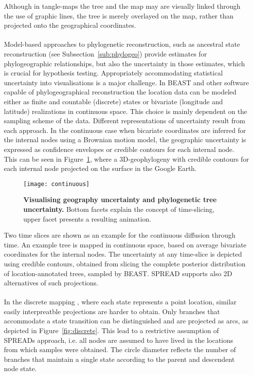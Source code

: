 Although in tangle-maps the tree and the map may are visually linked through the use of graphic lines, the tree is merely overlayed on the map, rather than projected onto the geographical coordinates.

\paragraph{}
Model-based approaches to phylogenetic reconstruction, such as ancestral state reconstruction (see Subsection~\ref{sub:phylogeo}) provide estimates for phylogeographic relationships, but also the uncertainty in those estimates, which is crucial for hypothesis testing.
Appropriately accommodating statistical uncertainty into visualisations is a major challenge.
In BEAST and other software capable of phylogeographical reconstruction the location data can be modeled either as finite and countable (discrete) states or bivariate (longitude and latitude) realizations in continuous space.
This choice is mainly dependent on the sampling scheme of the data.
Different representations of uncertainty result from each approach.
In the continuous case when bicariate coordinates are inferred for the internal nodes using a Brownian motion model, the geographic uncertainty is expressed as confidence envelopes or credible contours for each internal node.
This can be seen in Figure~\ref{fig:cont}, where a 3D-geophylogeny with credible contours for each internal node projected on the surface in the Google Earth.

\begin{figure}[H]
\centering
\texttt{[image: continuous]}
\caption{
{ \footnotesize 
{\bf Visualising geography uncertainty and phylogenetic tree uncertainty.} 
Bottom facets explain the concept of time-slicing, upper facet presents a resulting animation.
} %
}
\label{fig:cont}
\end{figure}

Two time slices are shown as an example for the continuous diffusion through time. 
An example tree is mapped in continuous space, based on average bivariate coordinates for the internal nodes. 
The uncertainty at any time-slice is depicted using credible contours, obtained from slicing the complete posterior distribution of location-annotated trees, sampled by BEAST.
SPREAD supports also 2D alternatives of such projections.

\paragraph{}
In the discrete mapping , where each state represents a point location, similar easily interpreatble projections are harder to obtain.
Only branches that accommodate a state transition can be distinguished and are projected as arcs, as depicted in Figure~\ref{fig:discrete}.
This lead to a restrictive assumption of SPREADs approach, i.e. all nodes are assumed to have lived in the locations from which samples were obtained.
The circle diameter reflects the number of branches that maintain a single state according to the parent and descendent node state.


